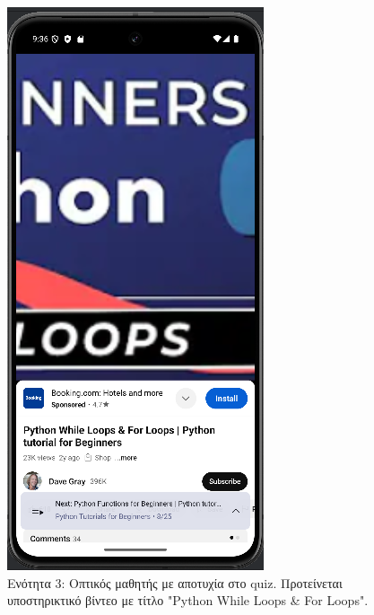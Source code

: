 \documentclass[11pt]{report}
\begin{document}
\begin{figure}[H]
  \centering
  \includegraphics[width=\linewidth, height=0.35\textheight, keepaspectratio]{Figures/εικόνα (8).png}
  \caption{Ενότητα 3: Οπτικός μαθητής με αποτυχία στο quiz. Προτείνεται υποστηρικτικό βίντεο με τίτλο "Python While Loops \& For Loops".}
\end{figure}
\end{document}
